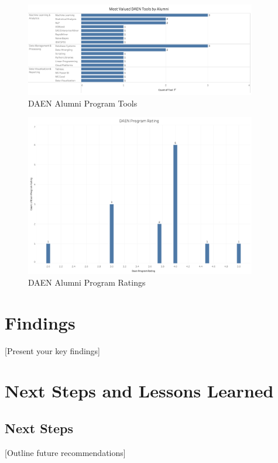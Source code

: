 \documentclass[12pt,a4paper]{article}
\begin{document}
\begin{figure}[H]
    \centering
    \includegraphics[width=0.9\textwidth]{visualizations/daen-tools.png}
    \caption{DAEN Alumni Program Tools}
    \label{fig:daen-tools}
\end{figure}

\begin{figure}[H]
    \centering
    \includegraphics[width=0.9\textwidth]{visualizations/daen-rating.png}
    \caption{DAEN Alumni Program Ratings}
    \label{fig:daen-rating}
\end{figure}

\section{Findings}
[Present your key findings]

\section{Next Steps and Lessons Learned}
\subsection{Next Steps}
[Outline future recommendations]
\end{document}
